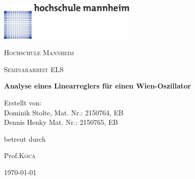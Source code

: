 \begin{titlepage}

  \includegraphics[width=0.5\textwidth]{../common/hsma-logo.pdf}\par\vspace{1cm}
  \centering
	{\scshape\LARGE Hochschule Mannheim \par}
	\vspace{1cm}
	{\scshape\Large Seminararbeit ELS\par}
	\vspace{1.5cm}
	{\huge\bfseries Analyse eines Linearreglers für einen Wien-Oszillator\par}
	\vspace{2cm}
	{\Large Erstellt von:\\Dominik Stolte, Mat. Nr.: 2150764, EB\\ 
	Dennis Henky Mat. Nr.:  2150765, EB\par}
	\vfill
	betreut durch\par
	Prof.\textsc{Koca}
	\vfill
	{\large \today\par}
\end{titlepage}